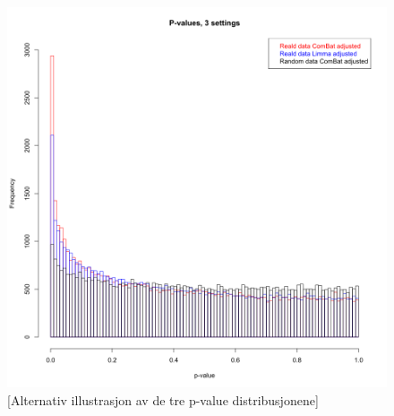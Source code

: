\documentclass{bio}
\newcommand\NOTE[1]{{\color{red}[#1]}}
\begin{document}
\begin{figure}[!p]
\centering\includegraphics[width=13cm]{Fig/pvaluesjohnson2.png}
\caption{
\NOTE{Alternativ illustrasjon av de tre p-value distribusjonene}
}
\label{fig:pdist-johnson}
\end{figure}


\end{document}
